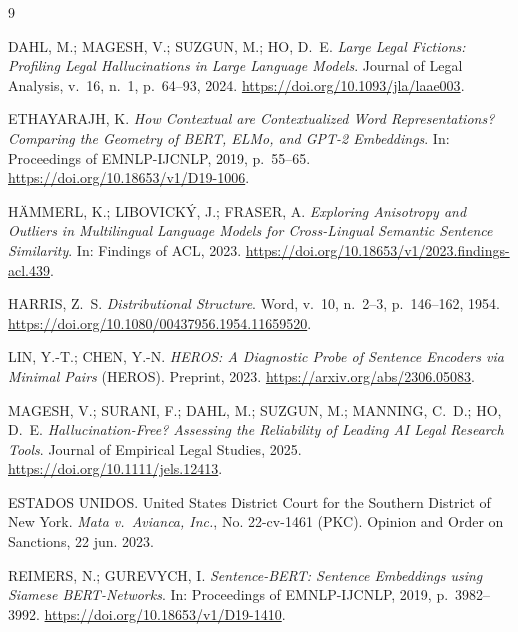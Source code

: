 \documentclass[11pt]{article}
\begin{document}
\begin{thebibliography}{9}
\small

DAHL, M.; MAGESH, V.; SUZGUN, M.; HO, D.~E.
\emph{Large Legal Fictions: Profiling Legal Hallucinations in Large Language
Models}. Journal of Legal Analysis, v.~16, n.~1, p.~64--93, 2024.
\url{https://doi.org/10.1093/jla/laae003}.

ETHAYARAJH, K.
\emph{How Contextual are Contextualized Word Representations? Comparing the
Geometry of BERT, ELMo, and GPT-2 Embeddings}. In: Proceedings of EMNLP-IJCNLP,
2019, p.~55--65. \url{https://doi.org/10.18653/v1/D19-1006}.

HÄMMERL, K.; LIBOVICKÝ, J.; FRASER, A.
\emph{Exploring Anisotropy and Outliers in Multilingual Language Models for
Cross-Lingual Semantic Sentence Similarity}. In: Findings of ACL, 2023.
\url{https://doi.org/10.18653/v1/2023.findings-acl.439}.

HARRIS, Z.~S.
\emph{Distributional Structure}. Word, v.~10, n.~2--3, p.~146--162, 1954.
\url{https://doi.org/10.1080/00437956.1954.11659520}.

LIN, Y.-T.; CHEN, Y.-N.
\emph{HEROS: A Diagnostic Probe of Sentence Encoders via Minimal Pairs} (HEROS).
Preprint, 2023. \url{https://arxiv.org/abs/2306.05083}.

MAGESH, V.; SURANI, F.; DAHL, M.; SUZGUN, M.; MANNING, C.~D.; HO, D.~E.
\emph{Hallucination-Free? Assessing the Reliability of Leading AI Legal Research
Tools}. Journal of Empirical Legal Studies, 2025.
\url{https://doi.org/10.1111/jels.12413}.

ESTADOS UNIDOS. United States District Court for the Southern District of New
York. \emph{Mata v.\ Avianca, Inc.}, No. 22-cv-1461 (PKC). Opinion and Order on
Sanctions, 22 jun. 2023.

REIMERS, N.; GUREVYCH, I.
\emph{Sentence-BERT: Sentence Embeddings using Siamese BERT-Networks}. In:
Proceedings of EMNLP-IJCNLP, 2019, p.~3982--3992.
\url{https://doi.org/10.18653/v1/D19-1410}.

\end{thebibliography}
\end{document}
